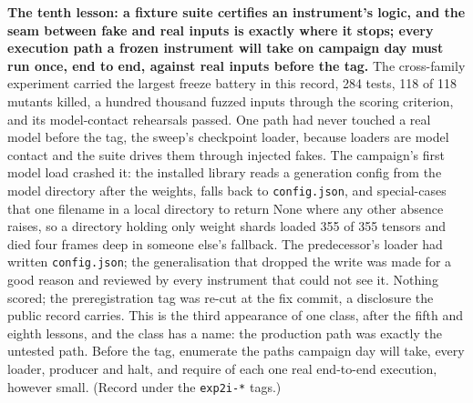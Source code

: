 \textbf{The tenth lesson: a fixture suite certifies an instrument's logic,
and the seam between fake and real inputs is exactly where it stops;
every execution path a frozen instrument will take on campaign day
must run once, end to end, against real inputs before the tag.} The
cross-family experiment carried the largest freeze battery in this
record, 284 tests, 118 of 118 mutants killed, a hundred thousand
fuzzed inputs through the scoring criterion, and its model-contact
rehearsals passed. One path had never touched a real model before the
tag, the sweep's checkpoint loader, because loaders are model contact
and the suite drives them through injected fakes. The campaign's first
model load crashed it: the installed library reads a generation config
from the model directory after the weights, falls back to
\texttt{config.json}, and special-cases that one filename in a local
directory to return None where any other absence raises, so a
directory holding only weight shards loaded 355 of 355 tensors and
died four frames deep in someone else's fallback. The predecessor's
loader had written \texttt{config.json}; the generalisation that dropped the
write was made for a good reason and reviewed by every instrument that
could not see it. Nothing scored; the preregistration tag was re-cut
at the fix commit, a disclosure the public record carries. This is the
third appearance of one class, after the fifth and eighth lessons, and
the class has a name: the production path was exactly the untested
path. Before the tag, enumerate the paths campaign day will take,
every loader, producer and halt, and require of each one real
end-to-end execution, however small. (Record under the \texttt{exp2i-*}
tags.)

